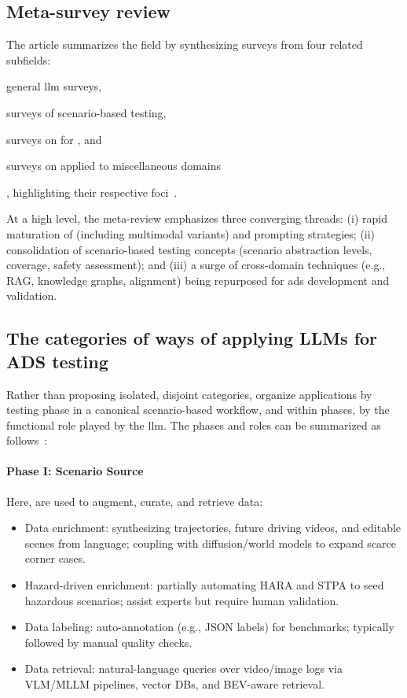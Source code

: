 \subsection{Meta-survey review}

The article summarizes the field by synthesizing surveys from four related
subfields:
\begin{inparaenum}
    \item general \acrshort{llm} surveys,
    \item surveys of scenario-based testing,
    \item surveys on  for , and
    \item surveys on  applied to miscellaneous domains
\end{inparaenum}, highlighting their respective
foci~\cite[p.~2]{surveyLLMScenarioBasedTesting}.

At a high level, the meta-review emphasizes three converging threads: (i) rapid
maturation of  (including multimodal variants) and prompting
strategies; (ii) consolidation of scenario-based testing concepts (scenario
abstraction levels, coverage, safety assessment); and (iii) a surge of
cross-domain techniques (e.g., RAG, knowledge graphs, alignment) being
repurposed for \acrshort{ads} development and validation.

\subsection{The categories of ways of applying LLMs for ADS testing}

Rather than proposing isolated, disjoint categories,
\citeauthor{surveyLLMScenarioBasedTesting} organize applications by testing
phase in a canonical scenario-based workflow, and within phases, by the
functional role played by the \acrshort{llm}. The phases and roles can be
summarized as follows~\cite{surveyLLMScenarioBasedTesting}:

\paragraph{Phase I: Scenario Source}
Here,  are used to augment, curate, and retrieve data:
\begin{itemize}
    \item Data enrichment: synthesizing trajectories, future driving videos, and
    editable scenes from language; coupling  with
    diffusion/world models to expand scarce corner cases.
    \item Hazard-driven enrichment: partially automating HARA and STPA to seed
    hazardous scenarios;  assist experts but require human
    validation.
    \item Data labeling: auto-annotation (e.g., JSON labels) for benchmarks;
    typically followed by manual quality checks.
    \item Data retrieval: natural-language queries over video/image logs via
    VLM/MLLM pipelines, vector DBs, and BEV-aware retrieval.
\end{itemize}

